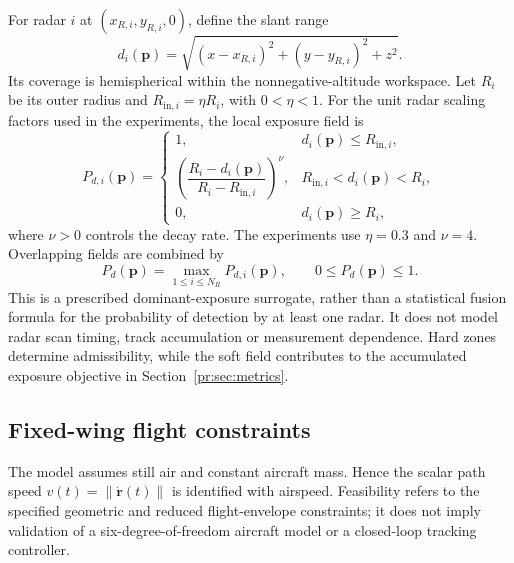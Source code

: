 \documentclass[preprint,12pt]{elsarticle}
\begin{document}
For radar $i$ at $(x_{R,i},y_{R,i},0)$, define the slant range
\begin{equation}
 d_i(\mathbf{p})=\sqrt{(x-x_{R,i})^2+(y-y_{R,i})^2+z^2}.
 \label{pr:eq:slant}
\end{equation}
Its coverage is hemispherical within the nonnegative-altitude workspace.
Let $R_i$ be its outer radius and $R_{\mathrm{in},i}=\eta R_i$, with
$0<\eta<1$. For the unit radar scaling factors used in the experiments,
the local exposure field is
\begin{equation}
 P_{d,i}(\mathbf{p})=
 \begin{cases}
  1, & d_i(\mathbf{p})\le R_{\mathrm{in},i},\\
  \left(\dfrac{R_i-d_i(\mathbf{p})}{R_i-R_{\mathrm{in},i}}\right)^{\nu},
       & R_{\mathrm{in},i}<d_i(\mathbf{p})<R_i,\\
  0, & d_i(\mathbf{p})\ge R_i,
 \end{cases}
 \label{pr:eq:exposurefield}
\end{equation}
where $\nu>0$ controls the decay rate. The experiments use $\eta=0.3$
and $\nu=4$. Overlapping fields are combined by
\begin{equation}
 P_d(\mathbf{p})=\max_{1\le i\le N_R}P_{d,i}(\mathbf{p}),
 \qquad 0\le P_d(\mathbf{p})\le1.
 \label{pr:eq:maxfield}
\end{equation}
This is a prescribed dominant-exposure surrogate, rather than a statistical
fusion formula for the probability of detection by at least one radar.
It does not model radar scan timing, track accumulation or measurement
dependence. Hard zones determine admissibility, while the soft field
contributes to the accumulated exposure objective in
Section~\ref{pr:sec:metrics}.

\subsection{Fixed-wing flight constraints}
\label{pr:sec:constraints}
The model assumes still air and constant aircraft mass. Hence the scalar
path speed $v(t)=\|\dot{\mathbf{r}}(t)\|$ is identified with airspeed.
Feasibility refers to the specified geometric and reduced flight-envelope
constraints; it does not imply validation of a six-degree-of-freedom
aircraft model or a closed-loop tracking controller.
\end{document}
